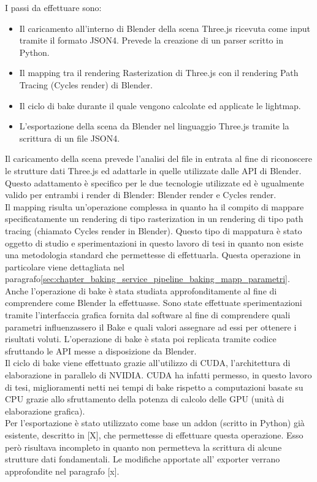 I passi da effettuare sono:
\begin{itemize}
\item Il caricamento all’interno di Blender della scena Three.js ricevuta come input tramite il formato JSON4. Prevede la creazione di un parser scritto in Python.
\item Il mapping tra il rendering Rasterization di Three.js con il rendering Path Tracing (Cycles render) di Blender.
\item Il ciclo di bake durante il quale vengono calcolate ed applicate le lightmap.
\item L’esportazione della scena da Blender nel linguaggio Three.js tramite la scrittura di un file JSON4.
\end{itemize}

Il caricamento della scena prevede l’analisi del file in entrata al fine di riconoscere le strutture dati Three.js ed adattarle in quelle utilizzate dalle API di Blender.
Questo adattamento è specifico per le due tecnologie utilizzate ed è ugualmente valido per entrambi i render di Blender: Blender render e Cycles render.
\\
Il mapping risulta un’operazione complessa in quanto ha il compito di mappare specificatamente un rendering di tipo rasterization in un rendering di tipo path tracing (chiamato Cycles render in Blender).
Questo tipo di mappatura è stato oggetto di studio e sperimentazioni in questo lavoro di tesi in quanto non esiste una metodologia standard che permettesse di effettuarla. Questa operazione in particolare viene dettagliata nel paragrafo\ref{sec:chapter_baking_service_pipeline_baking_mapp_parametri}.
\\
Anche l’operazione di bake è stata studiata approfonditamente al fine di comprendere come Blender la effettuasse. Sono state effettuate sperimentazioni tramite l’interfaccia grafica fornita dal software al fine di comprendere quali parametri influenzassero il Bake e quali valori assegnare ad essi per ottenere i risultati voluti. L’operazione di bake è stata poi replicata tramite codice sfruttando le API messe a disposizione da Blender.
\\
Il ciclo di bake viene effettuato grazie all’utilizzo di CUDA, l'architettura di elaborazione in parallelo di NVIDIA. 
CUDA ha infatti permesso, in questo lavoro di tesi, miglioramenti netti nei tempi di bake rispetto a computazioni basate su CPU grazie allo sfruttamento della potenza di calcolo delle GPU (unità di elaborazione grafica).
\\
Per l’esportazione è stato utilizzato come base un addon (scritto in Python) già esistente, descritto in [X], che permettesse di effettuare questa operazione. Esso però risultava incompleto in quanto non permetteva la scrittura di alcune strutture dati fondamentali. Le modifiche apportate all’ exporter verrano approfondite nel paragrafo [x].
